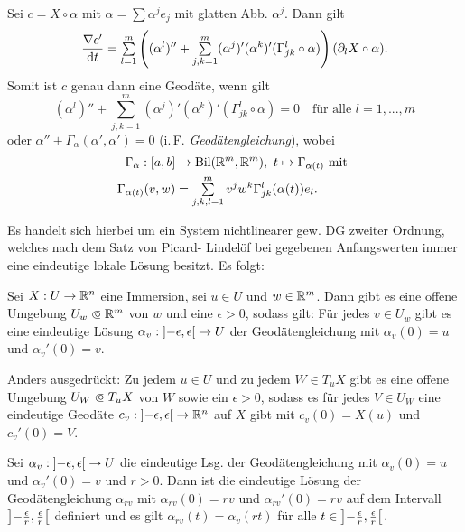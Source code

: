 \documentclass{cheat-sheet}
\newcommand{\Bil}{\mathrm{Bil}}
\begin{document}
\begin{bem}
  Sei $c = X \circ \alpha$ mit $\alpha = \sum \alpha^j e_j$ mit glatten Abb. $\alpha^j$. Dann gilt
  \[ \frac{\nabla c'}{\d t} = \sum_{l=1}^m \left( (\alpha^l)'' + \sum_{j,k=1}^m (\alpha^j)' (\alpha^k)' (\Gamma_{jk}^l \circ \alpha) \right) (\partial_l X \circ \alpha). \]
  Somit ist $c$ genau dann eine Geodäte, wenn gilt
  \[ (\alpha^l)'' + \sum_{j,k=1}^m (\alpha^j)' (\alpha^k)' (\Gamma_{jk}^l \circ \alpha) = 0 \quad \text{für alle $l = 1, ..., m$} \]
  oder $\alpha'' + \Gamma_{\alpha}(\alpha', \alpha') = 0$ (i.\,F. \emph{Geodätengleichung}), wobei
  \begin{align*}
    \Gamma_{\alpha} : \cinterval{a}{b} &\to \Bil(\R^m, \R^m), \  t \mapsto \Gamma_{\alpha(t)} \text{ mit }\\
    \Gamma_{\alpha(t)}(v, w) &= \sum_{j,k,l=1}^m v^j w^k \Gamma_{jk}^l (\alpha(t)) e_l.
  \end{align*}
\end{bem}

\begin{bem}
  Es handelt sich hierbei um ein System nichtlinearer gew. DG zweiter Ordnung, welches nach dem Satz von Picard- Lindelöf bei gegebenen Anfangswerten immer eine eindeutige lokale Lösung besitzt. Es folgt:
\end{bem}

\begin{satz}
  Sei $X : U \to \mathbb{R}^n$ eine Immersion, sei $u \in U$ und $w \in \mathbb{R}^m$. Dann gibt es eine offene Umgebung $U_w \opn \R^m$ von $w$ und eine $\epsilon > 0$, sodass gilt: Für jedes $v \in U_w$ gibt es eine eindeutige Lösung $\alpha_v : \left] -\epsilon, \epsilon \right[ \to U$ der Geodätengleichung mit $\alpha_v(0) = u$ und $\alpha_v'(0) = v$.

  Anders ausgedrückt: Zu jedem $u \in U$ und zu jedem $W \in T_u X$ gibt es eine offene Umgebung $U_W \opn T_u X$ von $W$ sowie ein $\epsilon > 0$, sodass es für jedes $V \in U_W$ eine eindeutige Geodäte $c_v : \left] -\epsilon, \epsilon \right[ \to \mathbb{R}^n$ auf $X$ gibt mit $c_v(0) = X(u)$ und $c_v'(0) = V$.
\end{satz}

\begin{satz}
  Sei $\alpha_v : \left] -\epsilon, \epsilon \right[ \to U$ die eindeutige Lsg. der Geodätengleichung mit $\alpha_v(0) = u$ und $\alpha_v'(0) = v$ und $r > 0$. Dann ist die eindeutige Lösung der Geodätengleichung $\alpha_{rv}$ mit $\alpha_{rv}(0) = rv$ und $\alpha_{rv}'(0) = rv$ auf dem Intervall $\left] -\tfrac{\epsilon}{r}, \tfrac{\epsilon}{r} \right[$ definiert und es gilt
  $\alpha_{rv}(t) = \alpha_v(rt)$ für alle $t \in \left] -\tfrac{\epsilon}{r}, \tfrac{\epsilon}{r} \right[$.
\end{satz}
\end{document}
